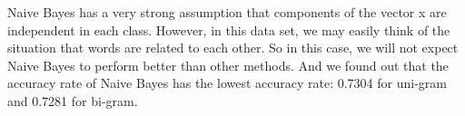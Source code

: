 
Naive Bayes has a very strong assumption that components of the vector x are independent in each class. However, in this data set, we may easily think of the situation that words are related to each other. So in this case, we will not expect Naive Bayes to perform better than other methods. And we found out that the accuracy rate of Naive Bayes has the lowest accuracy rate: 0.7304 for uni-gram and 0.7281 for bi-gram. \\